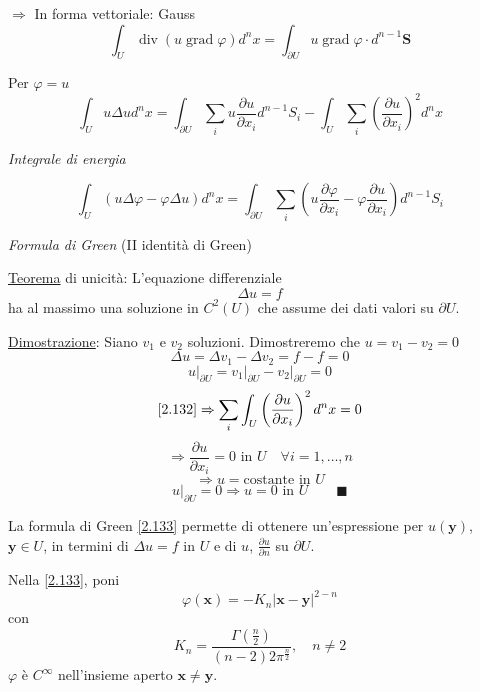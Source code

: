 \documentclass[a4paper,11pt]{report}
\newcommand{\vect}[1]{\boldsymbol{#1}}
\newcommand{\x}{\boldsymbol{x}}
\newcommand{\y}{\boldsymbol{y}}
\begin{document}
\medskip

$\Rightarrow$ In forma vettoriale: Gauss
\[
\int_U \operatorname{div} (u \operatorname{grad} \varphi) d^n x = \int_{\partial U} u \operatorname{grad} \varphi \cdot d^{n-1} \vect{S}
\]

\medskip

Per $\varphi=u$
\begin{equation}
\int_U u\Delta u d^n x = \int_{\partial U} \sum_i u\frac{\partial u}{\partial x_i}d^{n-1}S_i - \int_{U}\sum_i \left(\frac{\partial u}{\partial x_i}\right)^2 d^n x
\label{2.132}
\end{equation}
\centerline{\emph{Integrale di energia}}

\begin{equation}
\int_U \left(u\Delta \varphi - \varphi \Delta u\right)d^n x=\int_{\partial U} \sum_i \left( u\frac{\partial \varphi}{\partial x_i} - \varphi \frac{\partial u}{\partial x_i}\right) d^{n-1}S_i
\label{2.133}
\end{equation}
\centerline{\emph{Formula di Green} (II identit\`a di Green)}

\medskip

\underline{Teorema} di unicit\`a: L'equazione differenziale 
\[
\Delta u = f
\]
ha al massimo una soluzione in $C^2(U)$ che assume dei dati valori su $\partial U$.

\underline{Dimostrazione}: Siano $v_1$ e $v_2$ soluzioni. Dimostreremo che $u=v_1 - v_2=0$
\[
\Delta u=\Delta v_1 - \Delta v_2 = f-f =0
\]
\[
u\big|_{\partial U} = v_1 \big|_{\partial U} - v_2 \big|_{\partial U}=0
\]
\[
\eqref{2.132}\Rightarrow \sum_i\int_U \left(\frac{\partial u}{\partial x_i}\right)^2 d^n x=0
\]
\[
\Rightarrow \frac{\partial u}{\partial x_i}=0 \text{ in }U \quad \forall i=1,\ldots,n
\]
\[
\Rightarrow u= \text{costante in }U
\]
\[
u \big|_{\partial U}=0 \Rightarrow u=0 \text{ in }U \qquad \blacksquare
\]

La formula di Green \eqref{2.133} permette di ottenere un'espressione per $ u(\y)$, $\y \in U$, in termini di $\Delta u=f$ in $U$ e di $u$, $\frac{\partial u}{\partial n}$ su $\partial U$.

Nella \eqref{2.133}, poni
\[
\varphi(\x)=-K_n|\x-\y|^{2-n}
\]
con
\[
K_n= \frac{\Gamma (\frac{n}{2})}{(n-2)2\pi ^\frac{n}{2}}, \quad n\neq 2
\]
$\varphi$ \`e $C^\infty$ nell'insieme aperto $\x \neq \y$. 
\end{document}

